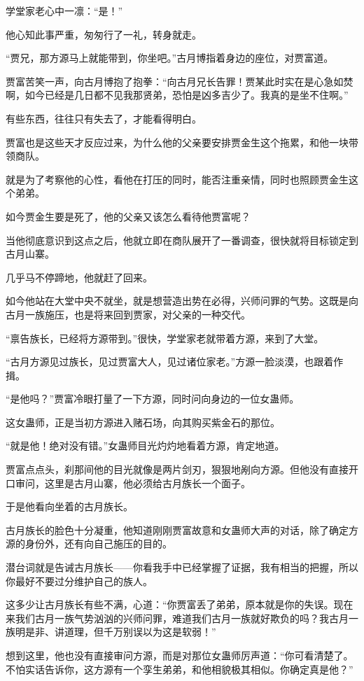 \begin{this_body}
学堂家老心中一凛：“是！”

他心知此事严重，匆匆行了一礼，转身就走。

“贾兄，那方源马上就能带到，你坐吧。”古月博指着身边的座位，对贾富道。

贾富苦笑一声，向古月博抱了抱拳：“向古月兄长告罪！贾某此时实在是心急如焚啊，如今已经是几日都不见我那贤弟，恐怕是凶多吉少了。我真的是坐不住啊。”

有些东西，往往只有失去了，才能看得明白。

贾富也是这些天才反应过来，为什么他的父亲要安排贾金生这个拖累，和他一块带领商队。

就是为了考察他的心性，看他在打压的同时，能否注重亲情，同时也照顾贾金生这个弟弟。

如今贾金生要是死了，他的父亲又该怎么看待他贾富呢？

当他彻底意识到这点之后，他就立即在商队展开了一番调查，很快就将目标锁定到古月山寨。

几乎马不停蹄地，他就赶了回来。

如今他站在大堂中央不就坐，就是想营造出势在必得，兴师问罪的气势。这既是向古月一族施压，也是将来回到贾家，对父亲的一种交代。

“禀告族长，已经将方源带到。”很快，学堂家老就带着方源，来到了大堂。

“古月方源见过族长，见过贾富大人，见过诸位家老。”方源一脸淡漠，也跟着作揖。

“是他吗？”贾富冷眼打量了一下方源，同时问向身边的一位女蛊师。

这女蛊师，正是当初方源进入赌石场，向其购买紫金石的那位。

“就是他！绝对没有错。”女蛊师目光灼灼地看着方源，肯定地道。

贾富点点头，刹那间他的目光就像是两片剑刃，狠狠地剐向方源。但他没有直接开口审问，这里是古月山寨，他必须给古月族长一个面子。

于是他看向坐着的古月族长。

古月族长的脸色十分凝重，他知道刚刚贾富故意和女蛊师大声的对话，除了确定方源的身份外，还有向自己施压的目的。

潜台词就是告诫古月族长——你看我手中已经掌握了证据，我有相当的把握，所以你最好不要过分维护自己的族人。

这多少让古月族长有些不满，心道：“你贾富丢了弟弟，原本就是你的失误。现在来我们古月一族气势汹汹的兴师问罪，难道我们古月一族就好欺负的吗？我古月一族明是非、讲道理，但千万别误以为这是软弱！”

想到这里，他也没有直接审问方源，而是对那位女蛊师厉声道：“你可看清楚了。不怕实话告诉你，这方源有一个孪生弟弟，和他相貌极其相似。你确定真是他？”


\end{this_body}
